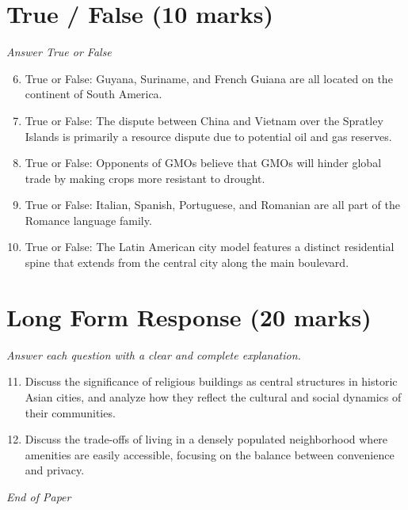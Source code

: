 \documentclass[12pt]{article}
\begin{document}
\section*{True / False (10 marks)}
\textit{Answer True or False}
\begin{enumerate}[label=\arabic*.]
\setcounter{enumi}{5}
\item True or False: Guyana, Suriname, and French Guiana are all located on the continent of South America.
\item True or False: The dispute between China and Vietnam over the Spratley Islands is primarily a resource dispute due to potential oil and gas reserves.
\item True or False: Opponents of GMOs believe that GMOs will hinder global trade by making crops more resistant to drought.
\item True or False: Italian, Spanish, Portuguese, and Romanian are all part of the Romance language family.
\item True or False: The Latin American city model features a distinct residential spine that extends from the central city along the main boulevard.
\end{enumerate}

\section*{Long Form Response (20 marks)}
\textit{Answer each question with a clear and complete explanation.}
\begin{enumerate}[label=\arabic*.]
\setcounter{enumi}{10}
\item Discuss the significance of religious buildings as central structures in historic Asian
cities, and analyze how they reflect the cultural and social dynamics of their
communities.
\item Discuss the trade-offs of living in a densely populated neighborhood where amenities are
easily accessible, focusing on the balance between convenience and privacy.
\end{enumerate}

\vfill
\noindent\textit{End of Paper}
\end{document}
